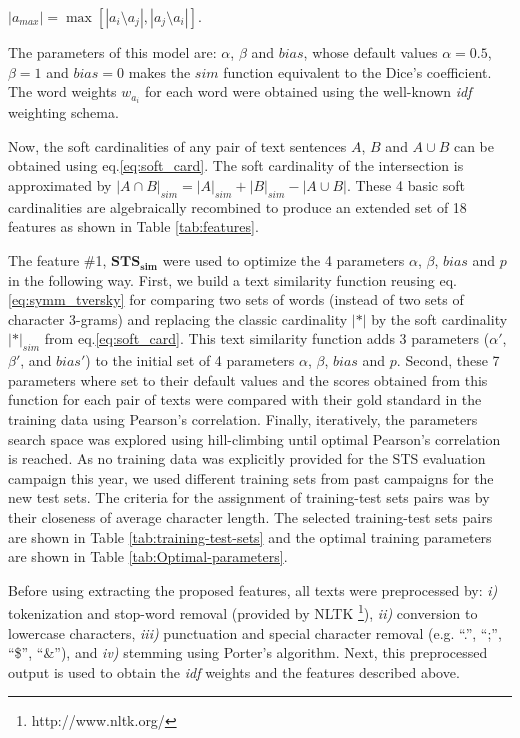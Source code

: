 \begin{center}
$|a_{max}|=\max[|a_{i}\setminus a_{j}|,|a_{j}\setminus a_{i}|]$.
\par\end{center}

The parameters of this model are: $\alpha$, $\beta$ and $bias$,
whose default values $\alpha=0.5$, $\beta=1$ and $bias=0$ makes
the $sim$ function equivalent to the Dice's coefficient. The word
weights $w_{a_{i}}$ for each word were obtained using the well-known
\emph{idf} weighting schema.

Now, the soft cardinalities of any pair of text sentences $A$, $B$
and $A\cup B$ can be obtained using eq.\ref{eq:soft_card}. The soft
cardinality of the intersection is approximated by $|A\cap B|_{sim}=|A|_{sim}+|B|_{sim}-|A\cup B|$.
These 4 basic soft cardinalities are algebraically recombined to produce
an extended set of 18 features as shown in Table \ref{tab:features}. 

The feature \#1, $\mathbf{STS_{sim}}$ were used to optimize the 4
parameters $\alpha$, $\beta$, $bias$ and $p$ in the following
way. First, we build a text similarity function reusing eq.\ref{eq:symm_tversky}
for comparing two sets of words (instead of two sets of character
3-grams) and replacing the classic cardinality $|*|$ by the soft
cardinality $|*|_{sim}$ from eq.\ref{eq:soft_card}. This text similarity
function adds 3 parameters ($\alpha'$, $\beta'$, and $bias'$) to
the initial set of 4 parameters $\alpha$, $\beta$, $bias$ and $p$.
Second, these 7 parameters where set to their default values and the
scores obtained from this function for each pair of texts were compared
with their gold standard in the training data using Pearson's correlation.
Finally, iteratively, the parameters search space was explored using
hill-climbing until optimal Pearson's correlation is reached. As no
training data was explicitly provided for the STS evaluation campaign
this year, we used different training sets from past campaigns for
the new test sets. The criteria for the assignment of training-test
sets pairs was by their closeness of average character length. The
selected training-test sets pairs are shown in Table \ref{tab:training-test-sets}
and the optimal training parameters are shown in Table \ref{tab:Optimal-parameters}.

Before using extracting the proposed features, all texts were preprocessed
by: \emph{i)} tokenization and stop-word removal (provided by NLTK%
\footnote{http://www.nltk.org/%
}), \emph{ii)} conversion to lowercase characters, \emph{iii)} punctuation
and special character removal (e.g. ``.'', ``;'', ``\$'', ``\&''),
and \emph{iv) }stemming using Porter's algorithm. Next, this preprocessed
output is used to obtain the \emph{idf} weights and the features described
above.

